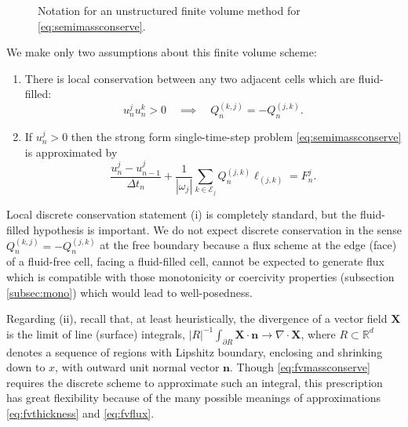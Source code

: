 \documentclass[final,leqno,onefignum,onetabnum]{siamltex1213bueler}
\newcommand\bn{\mathbf{n}}
\newcommand\bX{\mathbf{X}}
\newcommand{\Div}{\nabla\cdot}
\newcommand\RR{\mathbb{R}}
\begin{document}
\begin{figure}[ht]
\begin{center}

\end{center}
\caption{Notation for an unstructured finite volume method for \eqref{eq:semimassconserve}.}
\label{fig:fvmesh-notation}
\end{figure}

We make only two assumptions about this finite volume scheme:
\renewcommand{\labelenumi}{(\roman{enumi})}
\begin{enumerate}
\item There is local conservation between any two adjacent cells which are fluid-filled:
\begin{equation}
  u_n^j u_n^k > 0 \quad \implies \quad Q_n^{(k,j)}=-Q_n^{(j,k)}.  \label{eq:fvlocalconservation}
\end{equation}
\item If $u_n^j>0$ then the strong form single-time-step problem \eqref{eq:semimassconserve} is approximated by
\begin{equation}
\frac{u_n^j - u_{n-1}^j}{\Delta t_n} + \frac{1}{|\omega_j|} \sum_{k\in \mathcal{E}_j} Q_n^{(j,k)} \ell_{(j,k)} = F_n^j. \label{eq:fvmassconserve}
\end{equation}
\end{enumerate}

Local discrete conservation statement (i) is completely standard, but the fluid-filled hypothesis is important.  We do not expect discrete conservation in the sense $Q_n^{(k,j)}=-Q_n^{(j,k)}$ at the free boundary because a flux scheme at the edge (face) of a fluid-free cell, facing a fluid-filled cell, cannot be expected to generate flux which is compatible with those monotonicity or coercivity properties (subsection \ref{subsec:mono}) which would lead to well-posedness.

Regarding (ii), recall that, at least heuristically, the divergence of a vector field $\bX$ is the limit of line (surface) integrals, $|R|^{-1} \int_{\partial R} \bX\cdot \bn \to \Div \bX$, where $R\subset \RR^d$ denotes a sequence of regions with Lipshitz boundary, enclosing and shrinking down to $x$, with outward unit normal vector $\bn$.  Though \eqref{eq:fvmassconserve} requires the discrete scheme to approximate such an integral, this prescription has great flexibility because of the many possible meanings of approximations \eqref{eq:fvthickness} and \eqref{eq:fvflux}.
\end{document}
